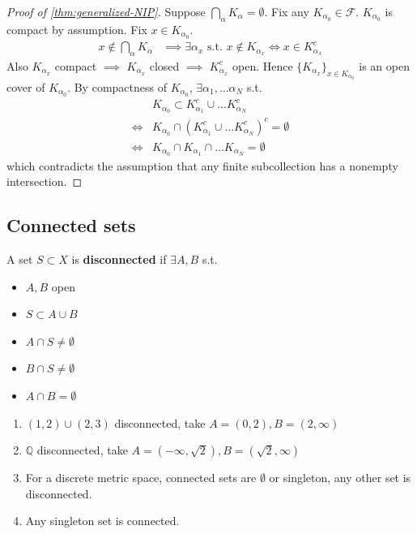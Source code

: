 \begin{proof}[Proof of \ref{thm:generalized-NIP}]
    Suppose $\bigcap_{\alpha}K_{\alpha} = \emptyset$. 
    Fix any $K_{\alpha_0} \in \mathcal{F}$. 
    $K_{\alpha_0}$ is compact by assumption. 
    Fix $x \in K_{\alpha_0}$. 
    \begin{align*}
        x \notin \bigcap_{\alpha}K_{\alpha} & 
        \implies \exists \alpha_x \text{ s.t. } x \notin K_{\alpha_x} 
        \iff x \in K_{\alpha_x}^c 
    \end{align*}
    Also 
    $K_{\alpha_x}$ compact $\implies$
    $K_{\alpha_x}$ closed $\implies$
    $K_{\alpha_x}^c$ open. 
    Hence $\{ K_{\alpha_x} \}_{x \in K_{\alpha_0}} $ is an open cover 
    of $K_{\alpha_0}$. 
    By compactness of $K_{\alpha_0}$, $\exists \alpha_1, \hdots \alpha_N$
    s.t. 
    \begin{align*}
        & K_{\alpha_0} \subset K_{\alpha_1}^c \cup \hdots K_{\alpha_N}^c \\
        \iff & K_{\alpha_0} \cap ( K_{\alpha_1}^c \cup \hdots K_{\alpha_N}^c)^c = \emptyset \\
        \iff & K_{\alpha_0} \cap  K_{\alpha_1} \cap \hdots K_{\alpha_N} = \emptyset
    \end{align*}
    which contradicts the assumption that any finite subcollection has a 
    nonempty intersection.
\end{proof}

\subsection{Connected sets}

\begin{definition}
    A set $S \subset X$ is \textbf{disconnected} if 
    $\exists A, B$ s.t. 
    \begin{itemize}
        \item $A, B$ open 
        \item $S \subset A \cup B$
        \item $A \cap S \neq \emptyset$
        \item $B \cap S \neq \emptyset$
        \item $A \cap B = \emptyset$
    \end{itemize} 
\end{definition}

\begin{example}
    \hfill 
    \begin{enumerate}
        \item $(1, 2) \cup (2, 3)$ disconnected, 
        take $A = (0, 2), B = (2, \infty)$
        \item $\mathbb{Q}$ disconnected, 
        take $A = (-\infty, \sqrt{2}), B = (\sqrt{2}, \infty)$
        \item For a discrete metric space, 
        connected sets are $\emptyset$ or singleton, 
        any other set is disconnected.
        \item Any singleton set is connected.
    \end{enumerate}
\end{example}

